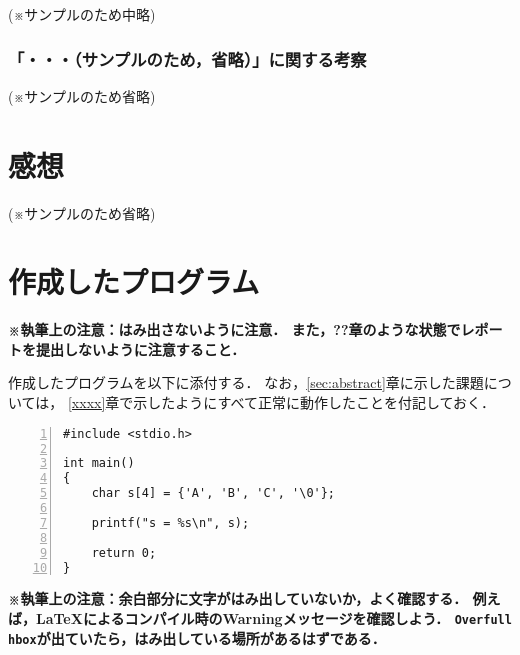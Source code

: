 (※サンプルのため中略)

\subsubsection{「・・・（\textbf{サンプルのため，省略}）」に関する考察}

(※サンプルのため省略)



\section{感想}

(※サンプルのため省略)

\section{作成したプログラム}
\textbf{\small ※執筆上の注意：はみ出さないように注意．
    また，??章のような状態でレポートを提出しないように注意すること．\\}

作成したプログラムを以下に添付する．
なお，\ref{sec:abstract}章に示した課題については，
\ref{xxxx}章で示したようにすべて正常に動作したことを付記しておく．

\begin{Verbatim}[numbers=left, xleftmargin=10mm, numbersep=6pt,
                    fontsize=\small, baselinestretch=0.8]
#include <stdio.h>

int main()
{
    char s[4] = {'A', 'B', 'C', '\0'};

    printf("s = %s\n", s);

    return 0;
}
\end{Verbatim}

\textbf{\small ※執筆上の注意：余白部分に文字がはみ出していないか，よく確認する．
    例えば，\LaTeX によるコンパイル時のWarningメッセージを確認しよう．
    \texttt{Overfull hbox}が出ていたら，はみ出している場所があるはずである．}


